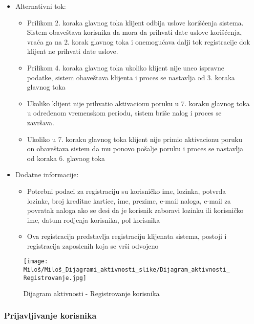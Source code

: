 \documentclass[a4paper]{article}
\begin{document}
\begin{itemize}
\begin{enumerate}
        \end{enumerate}
    \item Alternativni tok:
        \begin{itemize}
            \item Prilikom 2. koraka glavnog toka klijent odbija uslove korišćenja sistema. Sistem obaveštava korisnika da mora da prihvati date uslove korišćenja, vraća ga na 2. korak glavnog toka i onemogućava dalji tok registracije dok klijent ne prihvati date uslove.
            \item Prilikom 4. koraka glavnog toka ukoliko klijent nije uneo ispravne podatke, sistem obaveštava klijenta i proces se nastavlja od 3. koraka glavnog toka
            \item Ukoliko klijent nije prihvatio aktivacionu poruku u 7. koraku glavnog toka u određenom vremenskom periodu, sistem briše nalog i proces se završava.
            \item Ukoliko u 7. koraku glavnog toka klijent nije primio aktivacionu poruku on obaveštava sistem da mu ponovo pošalje poruku i proces se nastavlja od koraka 6. glavnog toka
        \end{itemize}
    \item Dodatne informacije:
        \begin{itemize}
            \item Potrebni podaci za registraciju su korisničko ime, lozinka, potvrda lozinke, broj kreditne kartice, ime, prezime, e-mail naloga, e-mail za povratak naloga ako se desi da je korisnik zaboravi lozinku ili korisničko ime, datum rodjenja korisnika, pol korisnika
            \item Ova registracija predstavlja registraciju klijenata sistema, postoji i registracija zaposlenih koja se vrši odvojeno
        \end{itemize}
\end{itemize}

\begin{figure}[htp]
    \centering
    \texttt{[image: Miloš/Miloš\_Dijagrami\_aktivnosti\_slike/Dijagram\_aktivnosti\_Registrovanje.jpg]}
    \caption{Dijagram aktivnosti - Registrovanje korisnika}
    \label{fig:Registracija aktivnost}
\end{figure}


\subsubsection{Prijavljivanje korisnika}
\end{document}
